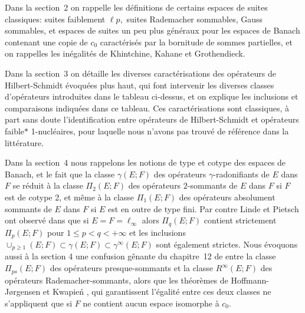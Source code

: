 \documentclass{smfart}
\theoremstyle{plain}
\theoremstyle{definition}
\begin{document}
\begin{center}
\end{center}


  
Dans la section~2 on rappelle les définitions de certains espaces de
suites classiques: suites faiblement $\ell p,$ suites Rademacher
sommables, Gauss sommables, et espaces de suites un peu plus
généraux pour les espaces de Banach contenant une copie de $c_0$
caractérisés par la bornitude de sommes partielles, et on
rappelles les inégalités de Khintchine, Kahane et Grothendieck.

Dans la section~3 on détaille les diverses caractérisations des
opérateurs de Hilbert-Schmidt évoquées plus haut, qui font
intervenir les diverses classes d'opérateurs introduites dans le
tableau ci-dessus, et on explique les inclusions et comparaisons
indiquées dans ce tableau. Ces caractérisations sont classiques,
à part sans doute l'identification entre opérateurs de
Hilbert-Schmidt et opérateurs faible$*$ 1-nucléaires, pour
laquelle nous n'avons pas trouvé de référence dans la
littérature.

Dans la section~4 nous rappelons les notions de type et cotype des
espaces de Banach, et le fait que la classe $\gamma(E; F)$ des
opérateurs $\gamma$-radonifiants de $E$ dans $F$ se réduit à la classe
$\Pi_2(E; F)$ des opérateurs $2$-sommants de $E$ dans $F$ si $F$ est
de cotype 2, et même à la classe $\Pi_1(E; F)$ des opérateurs
absolument sommants de $E$ dans $F$ si $E$ est en outre de type
fini. Par contre Linde et Pietsch ont observé dans \cite{lp} que si
$E=F=\ell_{\infty}$ alors $\Pi_q(E; F)$ contient strictement $\Pi_p(E;
F)$ pour $1\le p <q <+\infty$ et les inclusions $\cup_{p\ge 1}(E;
F)\subset \gamma(E; F)\subset \gamma^{\infty}(E; F)$ sont également
strictes. Nous évoquons aussi à la section 4 une confusion
gênante du chapitre~12 de \cite{DJT} entre la classe $\Pi_{ps}(E;F)$
des opérateurs presque-sommants et la classe $R^{\infty}(E;F)$ des
opérateurs Rademacher-sommants, alors que les théorèmes de
Hoffmann-J\o{}rgensen et Kwapie\'n \cite{HK}, \cite{Kwap} qui
garantissent l'égalité entre ces deux classes ne s'appliquent que
si $F$ ne contient aucun espace isomorphe à $c_0.$
\end{document}
